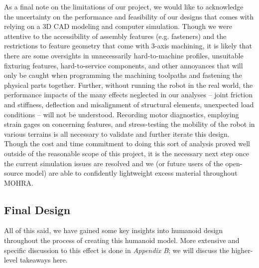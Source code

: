 \documentclass{article}
\begin{document}
As a final note on the limitations of our project, we would like to acknowledge the uncertainty on the performance and feasibility of our designs that comes with relying on a 3D CAD modeling and computer simulation. Though we were attentive to the accessibility of assembly features (e.g. fasteners) and the restrictions to feature geometry that come with 3-axis machining, it is likely that there are some oversights in unnecessarily hard-to-machine profiles, unsuitable fixturing features, hard-to-service components, and other annoyances that will only be caught when programming the machining toolpaths and fastening the physical parts together. Further, without running the robot in the real world, the performance impacts of the many effects neglected in our analyses -- joint friction and stiffness, deflection and misalignment of structural elements, unexpected load conditions -- will not be understood. Recording motor diagnostics, employing strain gages on concerning features, and stress-testing the mobility of the robot in various terrains is all necessary to validate and further iterate this design. Though the cost and time commitment to doing this sort of analysis proved well outside of the reasonable scope of this project, it is the necessary next step once the current simulation issues are resolved and we (or future users of the open-source model) are able to confidently lightweight excess material throughout MOHRA.

\subsection{Final Design}
All of this said, we have gained some key insights into humanoid design throughout the process of creating this humanoid model. More extensive and specific discussion to this effect is done in \textit{Appendix B}; we will discuss the higher-level takeaways here.
\end{document}
